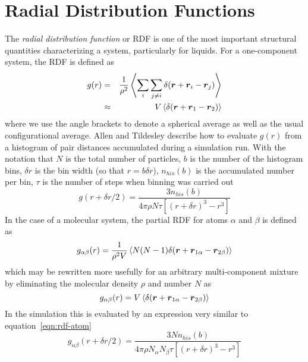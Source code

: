 \documentclass[twoside]{report}
\newcommand{\bm}[1]{\mbox{\boldmath \protect\(#1\protect\)}}
\begin{document}
\section{Radial Distribution Functions}%
\label{sec:rdf}
The {\em radial distribution function\/} or RDF is one of the most
important structural quantities characterizing a system, particularly
for liquids.  For a one-component system, the RDF is defined
as\cite[p445]{hansen:86}
\begin{eqnarray}
g(r) & = & \frac{1}{\rho^2} \left < \sum_i \sum_{j\neq i}
\delta(\bm{r} + \bm{r}_i - \bm{r}_j) \right > \\ \nonumber
 &  \approx  & V \left < \delta(\bm{r} + \bm{r}_1 - \bm{r}_2) \right >
\end{eqnarray}
where we use the angle brackets to denote a spherical average as well
as the usual configurational average.  Allen and
Tildesley\cite[pp184,185]{allen:87} describe how to evaluate $g(r)$
from a histogram of pair distances accumulated during a simulation
run. With the notation that $N$ is the total number of particles, $b$
is the number of the histogram bins, $\delta r$ is the bin width (so
that $r = b \delta r$), $n_{his}(b)$ is the accumulated number per
bin, $\tau$ is the number of steps when binning was carried out
\begin{equation}
\label{eqn:rdf-atom}
g(r + \delta r/2) = \frac{3 n_{his}(b)}{4 \pi \rho N \tau [(r + \delta r)^3 - r^3]}
\end{equation}
In the case of a molecular system, the partial RDF for atoms
$\alpha$ and $\beta$ is defined as\cite[p 445]{hansen:86}
\begin{equation}
g_{\alpha \beta}(r) = \frac{1}{\rho^2 V} \left < N(N-1)\delta(\bm{r} + \bm{r}_{1\alpha} - \bm{r}_{2\beta}) \right >
\end{equation}
which may be rewritten more usefully for an arbitrary multi-component
mixture by eliminating the molecular density $\rho$ and number $N$ as
\begin{equation}
g_{\alpha \beta}(r) = V \left < \delta(\bm{r} +  \bm{r}_{1\alpha} - \bm{r}_{2\beta}) \right >
\end{equation}
In the simulation this is evaluated by an expression very similar to
equation~\ref{eqn:rdf-atom}
\begin{equation}
\label{eqn:rdf-site}
g_{\alpha \beta}(r + \delta r/2) = \frac{3 N n_{his}(b)}{4 \pi
\rho N_\alpha N_\beta \tau [(r + \delta r)^3 - r^3]}
\end{equation}
\end{document}

